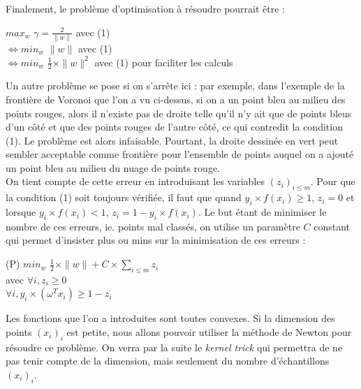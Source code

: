 \documentclass{article}
\begin{document}
Finalement, le problème d'optimisation à résoudre pourrait être :\\
 
           \begin{center}
           $max_{w}$ $\gamma = \frac{2}{\|w\|}$ avec (1)\\
           $\Leftrightarrow min_{w}$ $\|w\|$ avec (1)\\
           $\Leftrightarrow min_{w}$ $\frac{1}{2} \times \|w\|^2$ avec (1) pour faciliter les calculs
           \end{center}

\bigskip

Un autre problème se pose si on s'arrête ici : par exemple, dans l'exemple de la frontière de Voronoi que l'on a vu ci-dessus, si on a un point bleu au milieu des points rouges, alors il n'existe pas de droite telle qu'il n'y ait que de points bleus d'un côté et que des points rouges de l'autre côté, ce qui contredit la condition (1). Le problème est alors infaisable. Pourtant, la droite dessinée en vert peut sembler acceptable comme frontière pour l'ensemble de points auquel on a ajouté un point bleu au milieu du nuage de points rouge.\\

On tient compte de cette erreur en introduisant les variables $(z_i)_{i \leq m}$. Pour que la condition (1) soit toujours vérifiée, il faut que quand $y_i \times f(x_i) \geq 1$, $z_i = 0$ et lorsque $y_i \times f(x_i) < 1$, $z_i = 1 - y_i \times f(x_i)$. Le but étant de minimiser le nombre de ces erreurs, ie. points mal classés, on utilise un paramètre $C$ constant qui permet d'insister plus ou mins sur la minimisation de ces erreurs :\\ 


           \begin{center}
           (P) $min_{w}$ $\frac{1}{2} \times \|w\| + C \times \sum_{i \leq m}z_i$\\
           avec $\forall i, z_i \geq 0$\\
           $\forall i, y_i \times (\omega^{T} x_i) \geq 1 - z_i$\\
           \end{center}

\bigskip

Les fonctions que l'on a introduites sont toutes convexes. Si la dimension des points $(x_i)_i$ est petite, nous allons pouvoir utiliser la méthode de Newton pour résoudre ce problème. On verra par la suite le \emph{kernel trick} qui permettra de ne pas tenir compte de la dimension, mais seulement du nombre d'échantillons $(x_i)_i$.
\end{document}

